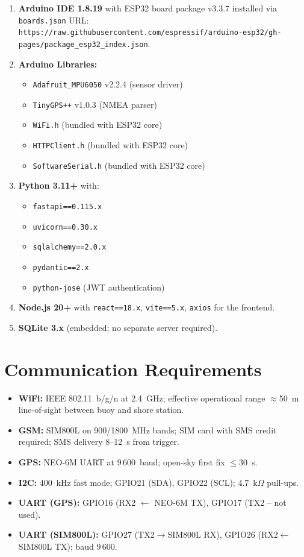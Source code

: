 \begin{enumerate}[label=SW-\arabic*.]
  \item \textbf{Arduino IDE 1.8.19} with ESP32 board package v3.3.7 installed via
        \texttt{boards.json} URL:
        \texttt{https://raw.githubusercontent.com/espressif/arduino-esp32/gh-pages/package\_esp32\_index.json}.
  \item \textbf{Arduino Libraries:}
        \begin{itemize}
          \item \texttt{Adafruit\_MPU6050} v2.2.4 (sensor driver)
          \item \texttt{TinyGPS++} v1.0.3 (NMEA parser)
          \item \texttt{WiFi.h} (bundled with ESP32 core)
          \item \texttt{HTTPClient.h} (bundled with ESP32 core)
          \item \texttt{SoftwareSerial.h} (bundled with ESP32 core)
        \end{itemize}
  \item \textbf{Python 3.11+} with:
        \begin{itemize}
          \item \texttt{fastapi==0.115.x}
          \item \texttt{uvicorn==0.30.x}
          \item \texttt{sqlalchemy==2.0.x}
          \item \texttt{pydantic==2.x}
          \item \texttt{python-jose} (JWT authentication)
        \end{itemize}
  \item \textbf{Node.js 20+} with \texttt{react==18.x}, \texttt{vite==5.x},
        \texttt{axios} for the frontend.
  \item \textbf{SQLite 3.x} (embedded; no separate server required).
\end{enumerate}

\section{Communication Requirements}

\begin{itemize}
  \item \textbf{WiFi:} IEEE 802.11~b/g/n at 2.4~GHz; effective operational range
        $\approx$50~m line-of-sight between buoy and shore station.
  \item \textbf{GSM:} SIM800L on 900/1800~MHz bands; SIM card with SMS credit
        required; SMS delivery 8--12~s from trigger.
  \item \textbf{GPS:} NEO-6M UART at 9\,600~baud; open-sky first fix $\leq$30~s.
  \item \textbf{I2C:} 400~kHz fast mode; GPIO21 (SDA), GPIO22 (SCL); 4.7~k$\Omega$
        pull-ups.
  \item \textbf{UART (GPS):} GPIO16 (RX2 $\leftarrow$ NEO-6M TX), GPIO17 (TX2 –
        not used).
  \item \textbf{UART (SIM800L):} GPIO27 (TX2$\rightarrow$SIM800L RX),
        GPIO26 (RX2$\leftarrow$SIM800L TX); baud 9\,600.
\end{itemize}
